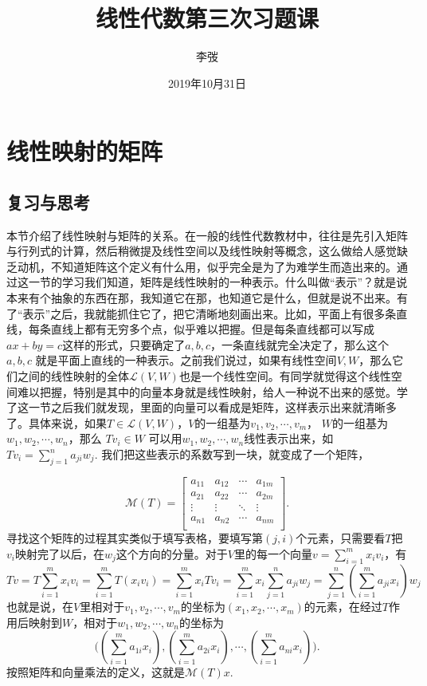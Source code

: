 \documentclass[hyperref,]{ctexart}
\title{线性代数第三次习题课}
\author{李弢}
\date{2019年10月31日}
\begin{document}
\maketitle

{
\setcounter{tocdepth}{2}
\tableofcontents
}
\def\vec{\overrightarrow} \def\calL{\mathcal{L}} \def\calM{\mathcal{M}}
\def\calP{\mathcal{P}} \def\F{\mathbf{F}}

\def\span{\mathrm{span}\,} \def\dim{\mathrm{dim}\,}
\def\Null{\mathrm{null}\,} \def\range{\mathrm{range}\,}

\section{线性映射的矩阵}\label{ux7ebfux6027ux6620ux5c04ux7684ux77e9ux9635}

\subsection{复习与思考}\label{ux590dux4e60ux4e0eux601dux8003}

本节介绍了线性映射与矩阵的关系。在一般的线性代数教材中，往往是先引入矩阵与行列式的计算，然后稍微提及线性空间以及线性映射等概念，这么做给人感觉缺乏动机，不知道矩阵这个定义有什么用，似乎完全是为了为难学生而造出来的。通过这一节的学习我们知道，矩阵是线性映射的一种表示。什么叫做``表示''？就是说本来有个抽象的东西在那，我知道它在那，也知道它是什么，但就是说不出来。有了``表示''之后，我就能抓住它了，把它清晰地刻画出来。比如，平面上有很多条直线，每条直线上都有无穷多个点，似乎难以把握。但是每条直线都可以写成
\(ax+by=c\)这样的形式，只要确定了\(a,b,c\)，一条直线就完全决定了，那么这个\(a,b,c\)
就是平面上直线的一种表示。之前我们说过，如果有线性空间\(V,W\)，那么它们之间的线性映射的全体\(\calL(V,W)\)也是一个线性空间。有同学就觉得这个线性空间难以把握，特别是其中的向量本身就是线性映射，给人一种说不出来的感觉。学了这一节之后我们就发现，里面的向量可以看成是矩阵，这样表示出来就清晰多了。具体来说，如果\(T\in\calL(V,W)\)，\(V\)的一组基为\(v_1,v_2,\cdots,v_m\)，
\(W\)的一组基为\(w_1,w_2,\cdots,w_n\)，那么 \(Tv_i\in W\)
可以用\(w_1,w_2,\cdots,w_n\)线性表示出来，如
\(Tv_i = \sum_{j=1}^n a_{ji}w_j\).
我们把这些表示的系数写到一块，就变成了一个矩阵，

\[\calM(T)=
\begin{bmatrix}
a_{11} & a_{12} & \cdots & a_{1m} \\
a_{21} & a_{22} & \cdots & a_{2m} \\
\vdots & \vdots & \ddots & \vdots \\
a_{n1} & a_{n2} & \cdots & a_{nm} \\
\end{bmatrix}.
\]
寻找这个矩阵的过程其实类似于填写表格，要填写第\((j,i)\)个元素，只需要看\(T\)把\(v_i\)映射完了以后，在\(w_j\)这个方向的分量。对于\(V\)里的每一个向量\(v = \sum_{i=1}^mx_iv_i\)，有
\[Tv = T\sum_{i=1}^mx_iv_i=\sum_{i=1}^mT(x_iv_i)=\sum_{i=1}^mx_iTv_i=\sum_{i=1}^mx_i\sum_{j=1}^na_{ji}w_j = \sum_{j=1}^n(\sum_{i=1}^ma_{ji}x_i)w_j \]
也就是说，在\(V\)里相对于\(v_1,v_2,\cdots,v_m\)的坐标为\((x_1,x_2,\cdots,x_m)\)的元素，在经过\(T\)作用后映射到\(W\)，相对于\(w_1,w_2,\cdots,w_n\)的坐标为
\[\big((\sum_{i=1}^ma_{1i}x_i),(\sum_{i=1}^ma_{2i}x_i),\cdots,(\sum_{i=1}^ma_{ni}x_i)\big).\]
按照矩阵和向量乘法的定义，这就是\(\calM(T)x\).
\end{document}
